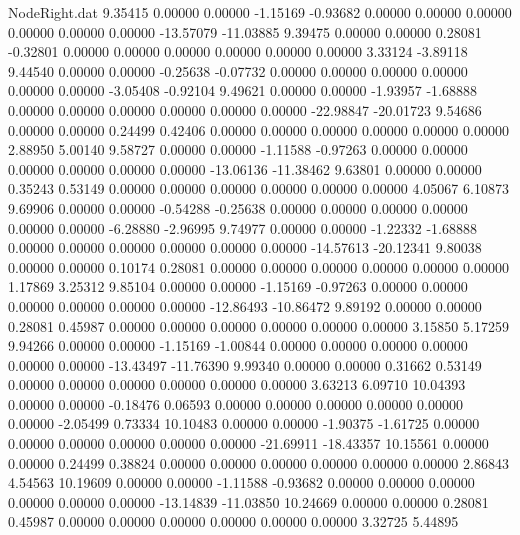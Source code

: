 \begin{filecontents}{NodeRight.dat}
   9.35415    0.00000    0.00000    -1.15169   -0.93682    0.00000    0.00000    0.00000    0.00000    0.00000    0.00000  -13.57079  -11.03885
   9.39475    0.00000    0.00000     0.28081   -0.32801    0.00000    0.00000    0.00000    0.00000    0.00000    0.00000    3.33124   -3.89118
   9.44540    0.00000    0.00000    -0.25638   -0.07732    0.00000    0.00000    0.00000    0.00000    0.00000    0.00000   -3.05408   -0.92104
   9.49621    0.00000    0.00000    -1.93957   -1.68888    0.00000    0.00000    0.00000    0.00000    0.00000    0.00000  -22.98847  -20.01723
   9.54686    0.00000    0.00000     0.24499    0.42406    0.00000    0.00000    0.00000    0.00000    0.00000    0.00000    2.88950    5.00140
   9.58727    0.00000    0.00000    -1.11588   -0.97263    0.00000    0.00000    0.00000    0.00000    0.00000    0.00000  -13.06136  -11.38462
   9.63801    0.00000    0.00000     0.35243    0.53149    0.00000    0.00000    0.00000    0.00000    0.00000    0.00000    4.05067    6.10873
   9.69906    0.00000    0.00000    -0.54288   -0.25638    0.00000    0.00000    0.00000    0.00000    0.00000    0.00000   -6.28880   -2.96995
   9.74977    0.00000    0.00000    -1.22332   -1.68888    0.00000    0.00000    0.00000    0.00000    0.00000    0.00000  -14.57613  -20.12341
   9.80038    0.00000    0.00000     0.10174    0.28081    0.00000    0.00000    0.00000    0.00000    0.00000    0.00000    1.17869    3.25312
   9.85104    0.00000    0.00000    -1.15169   -0.97263    0.00000    0.00000    0.00000    0.00000    0.00000    0.00000  -12.86493  -10.86472
   9.89192    0.00000    0.00000     0.28081    0.45987    0.00000    0.00000    0.00000    0.00000    0.00000    0.00000    3.15850    5.17259
   9.94266    0.00000    0.00000    -1.15169   -1.00844    0.00000    0.00000    0.00000    0.00000    0.00000    0.00000  -13.43497  -11.76390
   9.99340    0.00000    0.00000     0.31662    0.53149    0.00000    0.00000    0.00000    0.00000    0.00000    0.00000    3.63213    6.09710
  10.04393    0.00000    0.00000    -0.18476    0.06593    0.00000    0.00000    0.00000    0.00000    0.00000    0.00000   -2.05499    0.73334
  10.10483    0.00000    0.00000    -1.90375   -1.61725    0.00000    0.00000    0.00000    0.00000    0.00000    0.00000  -21.69911  -18.43357
  10.15561    0.00000    0.00000     0.24499    0.38824    0.00000    0.00000    0.00000    0.00000    0.00000    0.00000    2.86843    4.54563
  10.19609    0.00000    0.00000    -1.11588   -0.93682    0.00000    0.00000    0.00000    0.00000    0.00000    0.00000  -13.14839  -11.03850
  10.24669    0.00000    0.00000     0.28081    0.45987    0.00000    0.00000    0.00000    0.00000    0.00000    0.00000    3.32725    5.44895

\end{filecontents}
